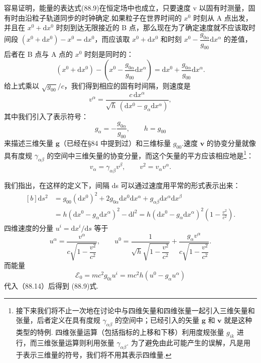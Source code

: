 容易证明，能量的表达式(88.9)在恒定场中也成立，只要速度 v 以固有时测量，固有时由沿粒子轨道同步的时钟确定.如果粒子在世界时间的 $x^0$ 时刻从 A 点出发，并且在 $x^0+\mathrm{d}x^0$ 时刻到达无限接近的 B 点，那么现在为了确定速度就不应该取时间段 $(x^0+\mathrm{d}x^0)-x^0=\mathrm{d}x^0$，而应该取 $x^0+\mathrm{d}x^0$ 和时刻 $x^0-\dfrac{g_{0\alpha}}{g_{00}}\mathrm{d}x^{\alpha}$ 的差值，后者在 B 点与 A 点的 $x^0$ 时刻是同时的：
\begin{equation*}
  (x^0+\mathrm{d}x^0)
  -\left(x^0-\frac{g_{0\alpha}}{g_{00}}\mathrm{d}x^{\alpha}\right)
  =\mathrm{d}x^0+\frac{g_{0\alpha}}{g_{00}}\mathrm{d}x^{\alpha}.
\end{equation*}
给上式乘以 $\sqrt{g_{00}}/c$，我们得到相应的固有时间隔，则速度是
\begin{equation}
  v^{\alpha}=\frac{c\,\mathrm{d}x^{\alpha}}
  {\sqrt{h}\,(\mathrm{d}x^0-g_{\alpha}\mathrm{d}x^{\alpha})},
\end{equation}
其中我们引入了表示符号：
\begin{equation}
  g_{\alpha}=-\frac{g_{0\alpha}}{g_{00}},\qquad h=g_{00}
\end{equation}
来描述三维矢量 $\boldsymbol{g}$（已经在§84 中提到过）和三维标量 $g_{00}$.速度 $\boldsymbol{v}$ 的协变分量就像具有度规 $\gamma_{\alpha\beta}$ 的空间中三维矢量的协变分量，而这个矢量的平方应该相应地是\footnote{接下来我们将不止一次地在讨论中与四维矢量和四维张量一起引入三维矢量和张量，后者定义在具有度规 $\gamma_{\alpha\beta}$ 的空间中；已经引入的矢量 $\boldsymbol{g}$ 和 $\boldsymbol{v}$ 就是这种类型的特例. 四维张量运算（包括指标的上移和下移）利用度规张量 $g_{ik}$ 进行，而三维张量运算则利用张量 $\gamma_{\alpha\beta}$. 为了避免由此可能产生的误解，凡是用于表示三维量的符号，我们将不用其表示四维量.}：
\begin{equation}
  v_{\alpha}=\gamma_{\alpha\beta}v^{\beta},\qquad
  v^2=v_{\alpha}v^{\alpha}.
\end{equation}

我们指出，在这样的定义下，间隔 ds 可以通过速度用平常的形式表示出来：
\begin{equation}
\begin{aligned}[b]
  \mathrm{d}s^2&=g_{00}(\mathrm{d}x^0)^2
  +2g_{0\alpha}\mathrm{d}x^0\mathrm{d}x^{\alpha}
  +g_{\alpha\beta}\mathrm{d}x^{\alpha}\mathrm{d}x^{\beta}\\
  &=h(\mathrm{d}x^0-g_{\alpha}\mathrm{d}x^{\alpha})^2-\mathrm{d}l^2
  =h(\mathrm{d}x^0-g_{\alpha}\mathrm{d}x^{\alpha})^2
  \left(1-\frac{v^2}{c^2}\right).
\end{aligned}
\end{equation}
四维速度的分量 $u^i=\mathrm{d}x^i/\mathrm{d}s$ 等于
\begin{equation}
  u^{\alpha}=\frac{v^{\alpha}}{c\sqrt{1-\dfrac{v^2}{c^2}}},\qquad
  u^0=\frac{1}{\sqrt{h}\sqrt{1-\dfrac{v^2}{c^2}}}
  +\frac{g_{\alpha}v^{\alpha}}{c\sqrt{1-\dfrac{v^2}{c^2}}}.
\end{equation}
而能量
\begin{equation*}
  \mathcal{E}_0=mc^2g_{0i}u^i=mc^2h(u^0-g_{\alpha}u^{\alpha})
\end{equation*}
代入（88.14）后得到 (88.9)式.

